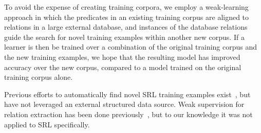To avoid the expense of creating training corpora, we employ a weak-learning approach in which the predicates in an existing training corpus are aligned to relations in a large external database, and instances of the database relations guide the search for novel training examples within another new corpus. 
If a learner is then be trained over a combination of the original training corpus and the new training examples, we hope that the resulting model has improved accuracy over the new corpus, compared to a model trained on the original training corpus alone.

Previous efforts to automatically find novel SRL training examples exist~\cite{furstenau_semi-supervised_2012}, but have not leveraged an external structured data source.
Weak supervision for relation extraction has been done previously~\cite{mintz_distant_2009}, but to our knowledge it was not applied to SRL specifically.
